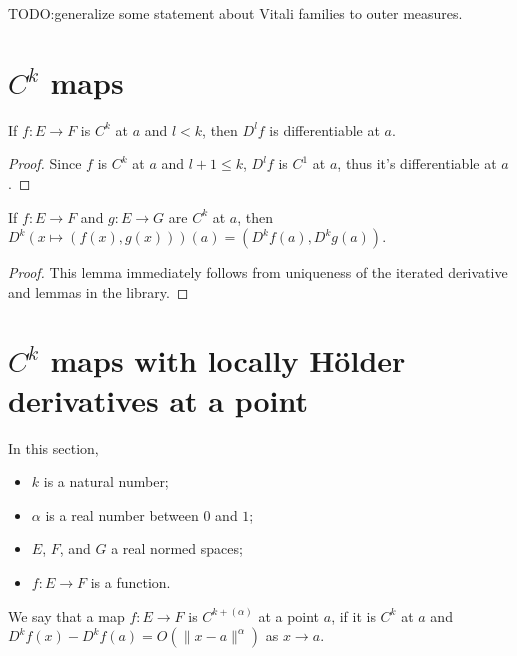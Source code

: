 TODO:\@ generalize some statement about Vitali families to outer measures.

\section{\(C^k\) maps}%
\label{sec:ck-maps}

\begin{lemma}%
  \label{lem:Ck-differentiable-iteratedFDeriv}
  \leanok%
  If \(f \colon E \to F\) is \(C^{k}\) at \(a\) and \(l < k\),
  then \(D^{l}f\) is differentiable at \(a\).
\end{lemma}
\begin{proof}
  \leanok%
  Since \(f\) is \(C^{k}\) at \(a\) and \(l + 1 \le k\),
  \(D^{l}f\) is \(C^{1}\) at \(a\),
  thus it's differentiable at \(a\).
\end{proof}

\begin{lemma}%
  \label{lem:iteratedFDeriv-prod}
  \leanok%
  If \(f\colon E \to F\) and \(g\colon E \to G\) are \(C^{k}\) at \(a\),
  then \(D^{k}(x \mapsto (f(x), g(x)))(a) = (D^{k}f(a), D^{k}g(a))\).
\end{lemma}
\begin{proof}
  \leanok%
  This lemma immediately follows from uniqueness of the iterated derivative
  and lemmas in the library.
\end{proof}

\section{\(C^{k}\) maps with locally Hölder derivatives at a point}%
\label{sec:cdh-at}

In this section,
\begin{itemize}
\item \(k\) is a natural number;
\item \(\alpha\) is a real number between \(0\) and \(1\);
\item \(E\), \(F\), and \(G\) a real normed spaces;
\item \(f\colon E \to F\) is a function.
\end{itemize}

\begin{definition}%
  \label{def:cdh-at}
  \leanok%
  We say that a map \(f\colon E\to F\) is \emph{\(C^{k+(\alpha)}\)} at a point \(a\),
  if it is \(C^{k}\) at \(a\) and \(D^{k}f(x) - D^{k}f(a) = O(\|x - a\|^{\alpha})\) as \(x\to a\).
\end{definition}

